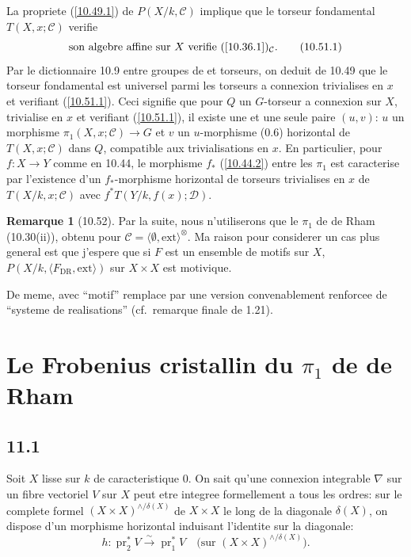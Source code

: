 \documentclass[12pt,a4paper]{article}
\theoremstyle{plain}
\theoremstyle{definition}
\newtheorem{remark}[theorem]{Remarque}
\theoremstyle{remark}
\DeclareMathOperator{\pr}{pr}
\newcommand{\DR}{\mathrm{DR}}
\newcommand{\ext}{\mathrm{ext}}
\begin{document}
La propriete (\ref{10.49.1}) de $P(X/k, \mathcal{C})$ implique que le torseur fondamental $T(X, x; \mathcal{C})$ verifie
\begin{equation}\label{10.51.1}
\text{son algebre affine sur $X$ verifie (\ref{10.36.1})$_{\mathcal{C}}$.} \tag{10.51.1}
\end{equation}
Par le dictionnaire 10.9 entre groupes de et torseurs, on deduit de 10.49 que le torseur fondamental est universel parmi les torseurs a connexion trivialises en $x$ et verifiant (\ref{10.51.1}). Ceci signifie que pour $Q$ un $G$-torseur a connexion sur $X$, trivialise en $x$ et verifiant (\ref{10.51.1}), il existe une et une seule paire $(u, v)$: $u$ un morphisme $\pi_1(X, x; \mathcal{C}) \to G$ et $v$ un $u$-morphisme (0.6) horizontal de $T(X, x; \mathcal{C})$ dans $Q$, compatible aux trivialisations en $x$. En particulier, pour $f: X \to Y$ comme en 10.44, le morphisme $f_*$ (\ref{10.44.2}) entre les $\pi_1$ est caracterise par l'existence d'un $f_*$-morphisme horizontal de torseurs trivialises en $x$ de $T(X/k, x; \mathcal{C})$ avec $f^* T(Y/k, f(x); \mathcal{D})$.

\begin{remark}[10.52]
Par la suite, nous n'utiliserons que le $\pi_1$ de de Rham (10.30(ii)), obtenu pour $\mathcal{C} = \langle \emptyset, \ext \rangle^{\otimes}$. Ma raison pour considerer un cas plus general est que j'espere que si $F$ est un ensemble de motifs sur $X$, $P(X/k, \langle F_{\DR}, \ext \rangle)$ sur $X \times X$ est motivique.

De meme, avec ``motif'' remplace par une version convenablement renforcee de ``systeme de realisations'' (cf.~remarque finale de 1.21).
\end{remark}


\section{Le Frobenius cristallin du $\pi_1$ de de Rham}

\subsection*{11.1}

Soit $X$ lisse sur $k$ de caracteristique 0. On sait qu'une connexion integrable $\nabla$ sur un fibre vectoriel $V$ sur $X$ peut etre integree formellement a tous les ordres: sur le complete formel $(X \times X)^{\wedge/\delta(X)}$ de $X \times X$ le long de la diagonale $\delta(X)$, on dispose d'un morphisme horizontal induisant l'identite sur la diagonale:
\begin{equation}\label{11.1.1}
h: \pr_2^* V \xrightarrow{\sim} \pr_1^* V \quad \text{(sur } (X \times X)^{\wedge/\delta(X)}\text{)}. \tag{11.1.1}
\end{equation}
\end{document}
